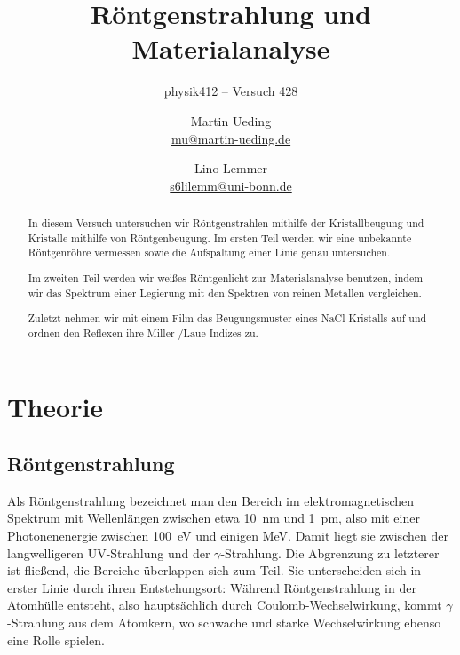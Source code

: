 


\usepackage[section]{placeins}
\usepackage{booktabs}

\newcommand\versuchsnummer{428}

\ihead{physik412 – Versuch \versuchsnummer}

\subject{Praktikumsprotokoll}
\title{Röntgenstrahlung und Materialanalyse}
\subtitle{physik412 – Versuch \versuchsnummer}
\author{
    Martin Ueding \\
    \small{\href{mailto:mu@martin-ueding.de}{mu@martin-ueding.de}}
    \and
    Lino Lemmer \\
    \small{\href{mailto:s6lilemm@uni-bonn.de}{s6lilemm@uni-bonn.de}}
}

\setcounter{secnumdepth}{4}
\setcounter{tocdepth}{3}



\maketitle

\begin{abstract}
    In diesem Versuch untersuchen wir Röntgenstrahlen mithilfe der
    Kristallbeugung und Kristalle mithilfe von Röntgenbeugung. Im ersten Teil
    werden wir eine unbekannte Röntgenröhre vermessen sowie die Aufspaltung
    einer Linie genau untersuchen.

    Im zweiten Teil werden wir weißes Röntgenlicht zur Materialanalyse
    benutzen, indem wir das Spektrum einer Legierung mit den Spektren von
    reinen Metallen vergleichen.

    Zuletzt nehmen wir mit einem Film das Beugungsmuster eines NaCl-Kristalls
    auf und ordnen den Reflexen ihre Miller-/Laue-Indizes zu.
\end{abstract}

\tableofcontents

\chapter{Theorie}

\section{Röntgenstrahlung}

Als Röntgenstrahlung bezeichnet man den Bereich im elektromagnetischen
Spektrum mit Wellenlängen zwischen etwa \SI{10}{\nano\meter} und
\SI{1}{\pico\meter}, also mit einer Photonenenergie zwischen
\SI{100}{\electronvolt} und einigen \si{\mega\electronvolt}. Damit liegt sie
zwischen der langwelligeren UV-Strahlung und der $\gamma$-Strahlung. Die
Abgrenzung zu letzterer ist fließend, die Bereiche überlappen sich zum
Teil. Sie unterscheiden sich in erster Linie durch ihren Entstehungsort:
Während Röntgenstrahlung in der Atomhülle entsteht, also hauptsächlich
durch Coulomb-Wechselwirkung, kommt $\gamma$-Strahlung aus dem Atomkern, wo
schwache und starke Wechselwirkung ebenso eine Rolle spielen.

